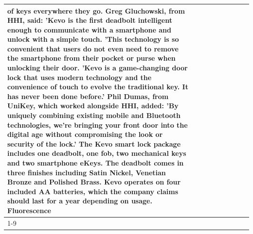 \begin{table}[H]
\begin{tabular}{lllrlllll}
of keys everywhere they go. Greg Gluchowski, from HHI, said: 'Kevo is the first deadbolt intelligent enough to communicate with a smartphone and unlock with a simple touch. 'This technology is so convenient that users do not even need to remove the smartphone from their pocket or purse when unlocking their door. 'Kevo is a game-changing door lock that uses modern technology and the convenience of touch to evolve the traditional key. It has never been done before.' Phil Dumas, from UniKey, which worked alongside HHI, added: 'By uniquely combining existing mobile and Bluetooth technologies, we’re bringing your front door into the digital age without compromising the look or security of the lock.' The Kevo smart lock package includes one deadbolt, one fob, two mechanical keys and two smartphone eKeys. The deadbolt comes in three finishes including Satin Nickel, Venetian Bronze and Polished Brass. Kevo operates on four included AA batteries, which the company claims should last for a year depending on usage. Fluorescence \\
\cline{1-9}

\end{tabular}
\end{table}
